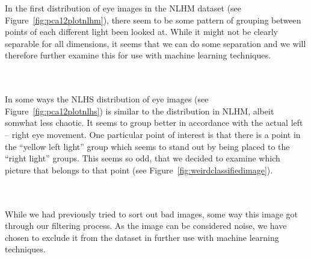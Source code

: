 In the first distribution of eye images in the NLHM dataset (see Figure~\ref{fig:pca12plotnlhm}), there seem to be some pattern of grouping between
points of each different light been looked at. While it might not be clearly separable for all dimensions, it seems that we can do some separation
and we will therefore further examine this for use with machine learning techniques.\\

\begin{minipage}{\linewidth}
  \centering
  \label{fig:pca12plotnlhs}
\end{minipage}\\\\
In some ways the NLHS distribution of eye images (see Figure~\ref{fig:pca12plotnlhs}) is similar to the distribution in NLHM, albeit somwhat less chaotic.
It seems to group better in accordance with the actual left -- right eye movement. One particular point of interest is that there is a point in the ``yellow left light'' group
which seems to stand out by being placed to the ``right light'' groups.
This seems so odd, that we decided to examine which picture that belongs to that point (see Figure~\ref{fig:weirdclassifiedimage}).\\

\begin{minipage}{\linewidth}
  \centering
  \label{fig:weirdclassifiedimage}
\end{minipage}\\\\

While we had previously tried to sort out bad images, some way this image got through our filtering process. As the image can be considered noise,
we have chosen to exclude it from the dataset in further use with machine learning techniques.\\

\begin{minipage}{\linewidth}
  \centering
  \label{fig:pca13plotwlhm}
\end{minipage}\\\\

